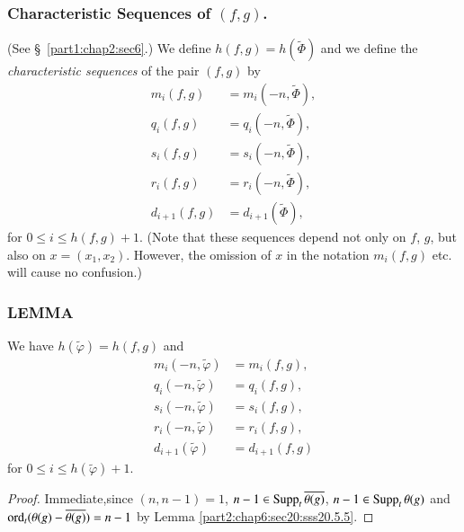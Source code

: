 \subsubsection{Characteristic Sequences of $(f,
  g)$.}\label{part2:chap6:sec20:sss20.5.6} 

(See \S\ \ref{part1:chap2:sec6}.) We define $h(f, g)= h(\tilde{\Phi})$
and we define the {\em characteristic sequences} of the pair $(f, g)$
by 
\begin{align*}
  m_i (f, g)& = m_i (-n, \tilde{\Phi}),\\
  q_i(f, g) & = q_i (-n, \tilde{\Phi}),\\
  s_i (f, g) & = s_i (-n, \tilde{\Phi}),\\
  r_i (f, g) & = r_i (-n, \tilde{\Phi}),\\
   d_{i+1}(f, g) & = d_{i+1} (\tilde{\Phi}),
\end{align*}
for $0 \leq i\leq h (f, g)+1$. (Note that these sequences depend not only
on $f$, $g$, but also on $x= (x_1, x_2)$. However, the omission of
$x$ in the notation $m_i (f, g)$ etc. will cause no confusion.)

\subsubsection{LEMMA}\label{part2:chap6:sec20:sss20.5.7}

We have  $h(\tilde{\varphi}) = h(f, g)$ and 
\begin{align*}
  m_i (-n, \tilde{\varphi}) & = m_i (f, g),\\
  q_i (-n, \tilde{\varphi}) & = q_i (f, g),\\
  s_i (-n, \tilde{\varphi}) & = s_i (f, g),\\
  r_i (-n, \tilde{\varphi}) & = r_i (f, g),\\
  d_{i+1} (\tilde{\varphi}) & = d_{i+1} (f, g)
\end{align*}
for $0 \leq i \leq h (\tilde{\varphi})+1$.

\begin{proof}
  Immediate,\pageoriginale since \gcd $(n, n-1)= 1$, $n-1 \in \operatorname{Supp}_t
  \overline{\theta(g)}$, $n-1 \in \operatorname{Supp}_t \theta (g)$ and $\operatorname{ord}_t (\theta
  (g) - \overline{\theta(g)})= n-1$ by Lemma \ref{part2:chap6:sec20:sss20.5.5}. 
\end{proof}

